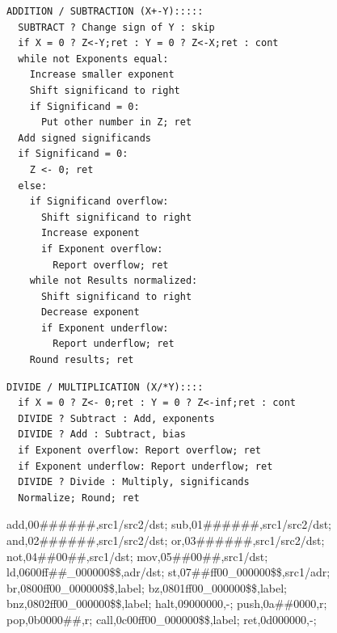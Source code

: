 \documentclass[a4paper]{article}
\begin{document}
\begin{multicols*}{2}
\begin{minipage}{.22\textwidth}
    \begin{verbatim}
ADDITION / SUBTRACTION (X+-Y):::::
  SUBTRACT ? Change sign of Y : skip
  if X = 0 ? Z<-Y;ret : Y = 0 ? Z<-X;ret : cont
  while not Exponents equal:
    Increase smaller exponent
    Shift significand to right
    if Significand = 0:
      Put other number in Z; ret
  Add signed significands
  if Significand = 0:
    Z <- 0; ret
  else:
    if Significand overflow:
      Shift significand to right
      Increase exponent
      if Exponent overflow:
        Report overflow; ret
    while not Results normalized:
      Shift significand to right
      Decrease exponent
      if Exponent underflow:
        Report underflow; ret
    Round results; ret
    \end{verbatim}
  \end{minipage}
  \begin{minipage}{0.2\textwidth}
    \begin{verbatim}
DIVIDE / MULTIPLICATION (X/*Y)::::
  if X = 0 ? Z<- 0;ret : Y = 0 ? Z<-inf;ret : cont
  DIVIDE ? Subtract : Add, exponents
  DIVIDE ? Add : Subtract, bias
  if Exponent overflow: Report overflow; ret
  if Exponent underflow: Report underflow; ret
  DIVIDE ? Divide : Multiply, significands
  Normalize; Round; ret
  \end{verbatim}

    \vspace{-0.5cm}

    add,00\#\#\#\#\#\#,src1/src2/dst;
    sub,01\#\#\#\#\#\#,src1/src2/dst;
    and,02\#\#\#\#\#\#,src1/src2/dst;
    or,03\#\#\#\#\#\#,src1/src2/dst;
    not,04\#\#00\#\#,src1/dst;
    mov,05\#\#00\#\#,src1/dst;
    ld,0600ff\#\#\_000000\$\$,adr/dst;
    st,07\#\#ff00\_000000\$\$,src1/adr;
    br,0800ff00\_000000\$\$,label;
    bz,0801ff00\_000000\$\$,label;
    bnz,0802ff00\_000000\$\$,label;
    halt,09000000,-;
    push,0a\#\#0000,r;
    pop,0b0000\#\#,r;
    call,0c00ff00\_000000\$\$,label;
    ret,0d000000,-;




\end{minipage}
\end{multicols*}
\end{document}
